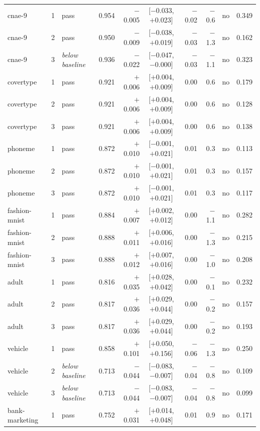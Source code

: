 {\begin{longtable}{lcl rrc rrcr}
\midrule
cnae-9 & 1 & pass & 0.954 & $-$0.005 & [$-$0.033, $+$0.023] & $-$0.02 & $-$0.6 & no & 0.349 \\
cnae-9 & 2 & pass & 0.950 & $-$0.009 & [$-$0.038, $+$0.019] & $-$0.03 & $-$1.3 & no & 0.162 \\
cnae-9 & 3 & \emph{below baseline} & 0.936 & $-$0.022 & [$-$0.047, $-$0.000] & $-$0.03 & $-$1.1 & no & 0.323 \\
\midrule
covertype & 1 & pass & 0.921 & $+$0.006 & [$+$0.004, $+$0.009] & 0.00 & 0.6 & no & 0.179 \\
covertype & 2 & pass & 0.921 & $+$0.006 & [$+$0.004, $+$0.009] & 0.00 & 0.6 & no & 0.128 \\
covertype & 3 & pass & 0.921 & $+$0.006 & [$+$0.004, $+$0.009] & 0.00 & 0.6 & no & 0.138 \\
\midrule
phoneme & 1 & pass & 0.872 & $+$0.010 & [$-$0.001, $+$0.021] & 0.01 & 0.3 & no & 0.113 \\
phoneme & 2 & pass & 0.872 & $+$0.010 & [$-$0.001, $+$0.021] & 0.01 & 0.3 & no & 0.157 \\
phoneme & 3 & pass & 0.872 & $+$0.010 & [$-$0.001, $+$0.021] & 0.01 & 0.3 & no & 0.117 \\
\midrule
fashion-mnist & 1 & pass & 0.884 & $+$0.007 & [$+$0.002, $+$0.012] & 0.00 & $-$1.1 & no & 0.282 \\
fashion-mnist & 2 & pass & 0.888 & $+$0.011 & [$+$0.006, $+$0.016] & 0.00 & $-$1.3 & no & 0.215 \\
fashion-mnist & 3 & pass & 0.888 & $+$0.012 & [$+$0.007, $+$0.016] & 0.00 & $-$1.0 & no & 0.208 \\
\midrule
adult & 1 & pass & 0.816 & $+$0.035 & [$+$0.028, $+$0.042] & 0.00 & $-$0.1 & no & 0.232 \\
adult & 2 & pass & 0.817 & $+$0.036 & [$+$0.029, $+$0.044] & 0.00 & $-$0.2 & no & 0.157 \\
adult & 3 & pass & 0.817 & $+$0.036 & [$+$0.029, $+$0.044] & 0.00 & $-$0.2 & no & 0.193 \\
\midrule
vehicle & 1 & pass & 0.858 & $+$0.101 & [$+$0.050, $+$0.156] & $-$0.06 & $-$1.3 & no & 0.250 \\
vehicle & 2 & \emph{below baseline} & 0.713 & $-$0.044 & [$-$0.083, $-$0.007] & $-$0.04 & $-$0.8 & no & 0.109 \\
vehicle & 3 & \emph{below baseline} & 0.713 & $-$0.044 & [$-$0.083, $-$0.007] & $-$0.04 & $-$0.8 & no & 0.099 \\
\midrule
bank-marketing & 1 & pass & 0.752 & $+$0.031 & [$+$0.014, $+$0.048] & 0.01 & 0.9 & no & 0.171 \\

\end{longtable}}
